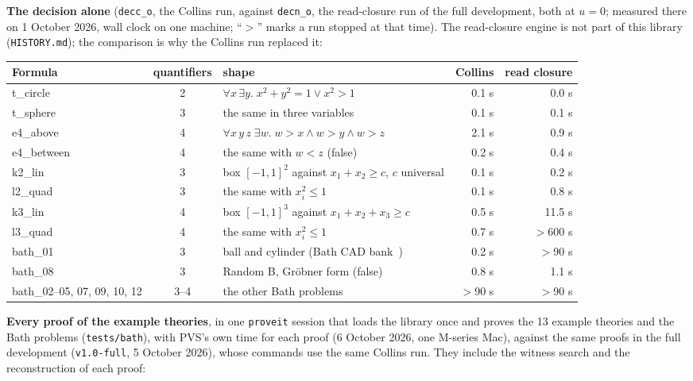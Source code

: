 \documentclass[11pt]{article}
\begin{document}
\textbf{The decision alone} (\texttt{decc\_o}, the Collins run, against \texttt{decn\_o}, the read-closure run of
the full development, both at $u = 0$; measured there on 1 October 2026, wall clock on one machine; ``$>$'' marks a
run stopped at that time). The read-closure engine is not part of this library (\texttt{HISTORY.md}); the comparison
is why the Collins run replaced it:

{\small
\begin{longtable}{@{}>{\ttfamily}p{} c p{} r r@{}}
\toprule
\textsf{\small\bfseries Formula} & \textsf{\small\bfseries quantifiers} & \textsf{\small\bfseries shape} & \textsf{\small\bfseries Collins} & \textsf{\small\bfseries read closure}\\
\midrule
t\_circle & 2 & $\forall x\,\exists y.\; x^2+y^2=1 \lor x^2>1$ & 0.1 s & 0.0 s\\
t\_sphere & 3 & the same in three variables & 0.1 s & 0.1 s\\
e4\_above & 4 & $\forall x\,y\,z\;\exists w.\; w>x \land w>y \land w>z$ & 2.1 s & 0.9 s\\
e4\_between & 4 & the same with $w<z$ (false) & 0.2 s & 0.4 s\\
k2\_lin & 3 & box $[-1,1]^2$ against $x_1+x_2 \ge c$, $c$ universal & 0.1 s & 0.2 s\\
l2\_quad & 3 & the same with $x_i^2 \le 1$ & 0.1 s & 0.8 s\\
k3\_lin & 4 & box $[-1,1]^3$ against $x_1+x_2+x_3 \ge c$ & 0.5 s & 11.5 s\\
l3\_quad & 4 & the same with $x_i^2 \le 1$ & 0.7 s & $>$600 s\\
bath\_01 & 3 & ball and cylinder (Bath CAD bank~\cite{bath}) & 0.2 s & $>$90 s\\
bath\_08 & 3 & Random B, Gr\"obner form (false) & 0.8 s & 1.1 s\\
bath\_02\textrm{--}05, 07, 09, 10, 12 & 3--4 & the other Bath problems & $>$90 s & $>$90 s\\
\bottomrule
\end{longtable}}

\textbf{Every proof of the example theories}, in one \texttt{proveit} session that loads the library once and proves
the 13 example theories and the Bath problems (\texttt{tests/bath}), with PVS's own time for each proof (6 October 2026, one M-series Mac), against the same
proofs in the full development (\texttt{v1.0-full}, 5 October 2026), whose commands use the same Collins run. They
include the witness search and the reconstruction of each proof:
\end{document}
